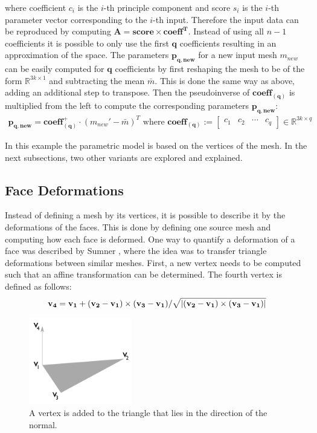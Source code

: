 where coefficient $c_i$ is the $i$-th principle component and score $s_i$ is the $i$-th parameter vector corresponding to the $i$-th input. Therefore the input data can be reproduced by computing $\mathbf{A = score \times {coeff}^T}$. Instead of using all $n-1$ coefficients it is possible to only use the first $\mathbf{q}$ coefficients resulting in an approximation of the space. The parameters $\mathbf{p_{q,new}}$ for a new input mesh $m_{new}$ can be easily computed for $\mathbf{q}$ coefficients by first reshaping the mesh to be of the form $\mathbb{R}^{3k \times 1}$ and subtracting the mean $\bar{m}$. This is done the same way as above, adding an additional step to transpose. Then the pseudoinverse of $\mathbf{coeff_{(q)}}$ is multiplied from the left to compute the corresponding parameters $\mathbf{p_{q,new}}$:
\begin{gather}
\mathbf{p_{q,new}} = \mathbf{coeff^+_{(q)}} \cdot (m_{new}' - \bar{m})^T  \text{  where }
\mathbf{coeff_{(q)}} :=
\begin{bmatrix}
 c_1&c_2&\cdots&c_{q}
\end{bmatrix}
\in \mathbb{R}^{3k \times q}
\end{gather}

In this example the parametric model is based on the vertices of the mesh. In the next subsections, two other variants are explored and explained.
\subsection{Face Deformations}
\label{faceDeform}
Instead of defining a mesh by its vertices, it is possible to describe it by the deformations of the faces. This is done by defining one source mesh and computing how each face is deformed. One way to quantify a deformation of a face was described by Sumner \cite{sumner2004deformation}, where the idea was to transfer triangle deformations between similar meshes. First, a new vertex needs to be computed such that an affine transformation can be determined. The fourth vertex is defined as follows:
\begin{gather}
  \mathbf{v_4} = \mathbf{v_1} + (\mathbf{v_2} - \mathbf{v_1})\times(\mathbf{v_3}-\mathbf{v_1})/\sqrt{\lvert(\mathbf{v_2}-\mathbf{v_1})\times(\mathbf{v_3}-\mathbf{v_1})\rvert} \label{normalequation}
\end{gather}
\begin{figure}[h]
\centering
\includegraphics[width=0.4\textwidth]{figures/normal}
\caption{A vertex is added to the triangle that lies in the direction of the normal.}
\label{fig:normal}
\end{figure}

